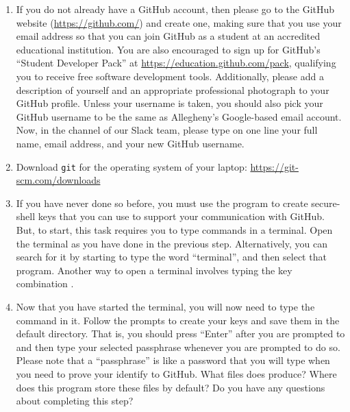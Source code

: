 \begin{enumerate}

  \item If you do not already have a GitHub account, then please go to the GitHub website (\url{https://github.com/}) and create one, making sure
    that you use your  email address so that you can join GitHub as a student at an accredited
    educational institution. You are also encouraged to sign up for GitHub's ``Student Developer Pack'' at
    \url{https://education.github.com/pack}, qualifying you to receive free software development tools. Additionally,
    please add a description of yourself and an appropriate professional photograph to your GitHub profile. Unless your
    username is taken, you should also pick your GitHub username to be the same as Allegheny's Google-based email
    account. Now, in the  channel of our Slack team, please type on one line your full name,
     email address, and your new GitHub username. 
  
  \item Download {\tt git} for the operating system of your laptop: \url{https://git-scm.com/downloads}

  \item If you have never done so before, you must use the  program to create secure-shell keys that
    you can use to support your communication with GitHub. But, to start, this task requires you to type commands in a terminal. Open the terminal as you have done in the previous step. Alternatively, you can search for it by starting to type the word ``terminal'', and then
    select that program. Another way to open a terminal involves typing the key combination .

  \item Now that you have started the terminal, you will now need to type the  command in it. Follow
    the prompts to create your keys and save them in the default directory. That is, you should press ``Enter'' after
    you are prompted to  and then type your selected passphrase
    whenever you are prompted to do so. Please note that a ``passphrase'' is like a password that you will type when you
    need to prove your identify to GitHub. What files does  produce? Where does this program store
    these files by default? Do you have any questions about completing this step?


\end{enumerate}
